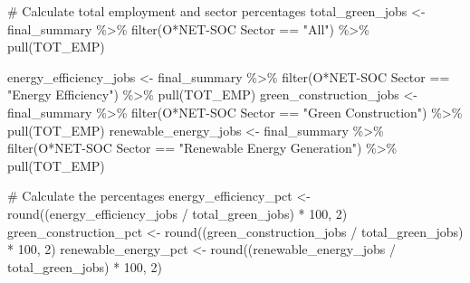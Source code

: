 \documentclass[
  letterpaper,
  DIV=11,
  numbers=noendperiod]{scrartcl}
\newenvironment{Shaded}{\begin{snugshade}}{\end{snugshade}}
\newcommand{\AttributeTok}[1]{\textcolor[rgb]{0.40,0.45,0.13}{#1}}
\newcommand{\CommentTok}[1]{\textcolor[rgb]{0.37,0.37,0.37}{#1}}
\newcommand{\DecValTok}[1]{\textcolor[rgb]{0.68,0.00,0.00}{#1}}
\newcommand{\FunctionTok}[1]{\textcolor[rgb]{0.28,0.35,0.67}{#1}}
\newcommand{\NormalTok}[1]{\textcolor[rgb]{0.00,0.23,0.31}{#1}}
\newcommand{\OtherTok}[1]{\textcolor[rgb]{0.00,0.23,0.31}{#1}}
\newcommand{\SpecialCharTok}[1]{\textcolor[rgb]{0.37,0.37,0.37}{#1}}
\newcommand{\StringTok}[1]{\textcolor[rgb]{0.13,0.47,0.30}{#1}}
\begin{document}
\begin{Shaded}
\begin{Highlighting}[]
\CommentTok{\# Calculate total employment and sector percentages}
\NormalTok{total\_green\_jobs }\OtherTok{\textless{}{-}}\NormalTok{ final\_summary }\SpecialCharTok{\%\textgreater{}\%} \FunctionTok{filter}\NormalTok{(}\StringTok{\textasciigrave{}}\AttributeTok{O*NET{-}SOC Sector}\StringTok{\textasciigrave{}} \SpecialCharTok{==} \StringTok{"All"}\NormalTok{) }\SpecialCharTok{\%\textgreater{}\%} \FunctionTok{pull}\NormalTok{(TOT\_EMP)}

\NormalTok{energy\_efficiency\_jobs }\OtherTok{\textless{}{-}}\NormalTok{ final\_summary }\SpecialCharTok{\%\textgreater{}\%} \FunctionTok{filter}\NormalTok{(}\StringTok{\textasciigrave{}}\AttributeTok{O*NET{-}SOC Sector}\StringTok{\textasciigrave{}} \SpecialCharTok{==} \StringTok{"Energy Efficiency"}\NormalTok{) }\SpecialCharTok{\%\textgreater{}\%} \FunctionTok{pull}\NormalTok{(TOT\_EMP)}
\NormalTok{green\_construction\_jobs }\OtherTok{\textless{}{-}}\NormalTok{ final\_summary }\SpecialCharTok{\%\textgreater{}\%} \FunctionTok{filter}\NormalTok{(}\StringTok{\textasciigrave{}}\AttributeTok{O*NET{-}SOC Sector}\StringTok{\textasciigrave{}} \SpecialCharTok{==} \StringTok{"Green Construction"}\NormalTok{) }\SpecialCharTok{\%\textgreater{}\%} \FunctionTok{pull}\NormalTok{(TOT\_EMP)}
\NormalTok{renewable\_energy\_jobs }\OtherTok{\textless{}{-}}\NormalTok{ final\_summary }\SpecialCharTok{\%\textgreater{}\%} \FunctionTok{filter}\NormalTok{(}\StringTok{\textasciigrave{}}\AttributeTok{O*NET{-}SOC Sector}\StringTok{\textasciigrave{}} \SpecialCharTok{==} \StringTok{"Renewable Energy Generation"}\NormalTok{) }\SpecialCharTok{\%\textgreater{}\%} \FunctionTok{pull}\NormalTok{(TOT\_EMP)}

\CommentTok{\# Calculate the percentages}
\NormalTok{energy\_efficiency\_pct }\OtherTok{\textless{}{-}} \FunctionTok{round}\NormalTok{((energy\_efficiency\_jobs }\SpecialCharTok{/}\NormalTok{ total\_green\_jobs) }\SpecialCharTok{*} \DecValTok{100}\NormalTok{, }\DecValTok{2}\NormalTok{)}
\NormalTok{green\_construction\_pct }\OtherTok{\textless{}{-}} \FunctionTok{round}\NormalTok{((green\_construction\_jobs }\SpecialCharTok{/}\NormalTok{ total\_green\_jobs) }\SpecialCharTok{*} \DecValTok{100}\NormalTok{, }\DecValTok{2}\NormalTok{)}
\NormalTok{renewable\_energy\_pct }\OtherTok{\textless{}{-}} \FunctionTok{round}\NormalTok{((renewable\_energy\_jobs }\SpecialCharTok{/}\NormalTok{ total\_green\_jobs) }\SpecialCharTok{*} \DecValTok{100}\NormalTok{, }\DecValTok{2}\NormalTok{)}


\end{Highlighting}
\end{Shaded}
\end{document}
